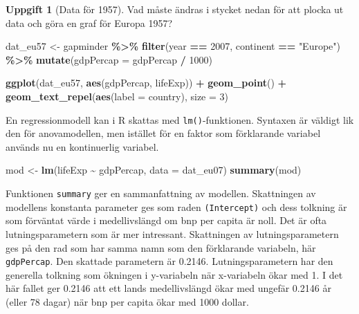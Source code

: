 \documentclass[
]{book}
\newenvironment{Shaded}{\begin{snugshade}}{\end{snugshade}}
\newcommand{\AttributeTok}[1]{\textcolor[rgb]{0.13,0.29,0.53}{#1}}
\newcommand{\DecValTok}[1]{\textcolor[rgb]{0.00,0.00,0.81}{#1}}
\newcommand{\FunctionTok}[1]{\textcolor[rgb]{0.13,0.29,0.53}{\textbf{#1}}}
\newcommand{\NormalTok}[1]{#1}
\newcommand{\OtherTok}[1]{\textcolor[rgb]{0.56,0.35,0.01}{#1}}
\newcommand{\SpecialCharTok}[1]{\textcolor[rgb]{0.81,0.36,0.00}{\textbf{#1}}}
\newcommand{\StringTok}[1]{\textcolor[rgb]{0.31,0.60,0.02}{#1}}
\theoremstyle{definition}
\theoremstyle{definition}
\theoremstyle{definition}
\newtheorem{exercise}{Uppgift}[chapter]
\theoremstyle{definition}
\theoremstyle{remark}
\begin{document}
\begin{exercise}[Data för 1957]

Vad måste ändras i stycket nedan för att plocka ut data och göra en graf för Europa 1957?

\begin{Shaded}
\begin{Highlighting}[]
\NormalTok{dat\_eu57 }\OtherTok{\textless{}{-}}\NormalTok{ gapminder }\SpecialCharTok{\%\textgreater{}\%} 
  \FunctionTok{filter}\NormalTok{(year }\SpecialCharTok{==} \DecValTok{2007}\NormalTok{, continent }\SpecialCharTok{==} \StringTok{"Europe"}\NormalTok{) }\SpecialCharTok{\%\textgreater{}\%} 
  \FunctionTok{mutate}\NormalTok{(}\AttributeTok{gdpPercap =}\NormalTok{ gdpPercap }\SpecialCharTok{/} \DecValTok{1000}\NormalTok{)}

\FunctionTok{ggplot}\NormalTok{(dat\_eu57, }\FunctionTok{aes}\NormalTok{(gdpPercap, lifeExp)) }\SpecialCharTok{+}
  \FunctionTok{geom\_point}\NormalTok{() }\SpecialCharTok{+}
  \FunctionTok{geom\_text\_repel}\NormalTok{(}\FunctionTok{aes}\NormalTok{(}\AttributeTok{label =}\NormalTok{ country), }\AttributeTok{size =} \DecValTok{3}\NormalTok{)}
\end{Highlighting}
\end{Shaded}

\end{exercise}

En regressionmodell kan i R skattas med \texttt{lm()}-funktionen. Syntaxen är väldigt lik den för anovamodellen, men istället för en faktor som förklarande variabel används nu en kontinuerlig variabel.

\begin{Shaded}
\begin{Highlighting}[]
\NormalTok{mod }\OtherTok{\textless{}{-}} \FunctionTok{lm}\NormalTok{(lifeExp }\SpecialCharTok{\textasciitilde{}}\NormalTok{ gdpPercap, }\AttributeTok{data =}\NormalTok{ dat\_eu07)}
\FunctionTok{summary}\NormalTok{(mod)}
\end{Highlighting}
\end{Shaded}

Funktionen \texttt{summary} ger en sammanfattning av modellen. Skattningen av modellens konstanta parameter ges som raden \texttt{(Intercept)} och dess tolkning är som förväntat värde i medellivslängd om bnp per capita är noll. Det är ofta lutningsparametern som är mer intressant. Skattningen av lutningsparametern ges på den rad som har samma namn som den förklarande variabeln, här \texttt{gdpPercap}. Den skattade parametern är 0.2146. Lutningsparametern har den generella tolkning som ökningen i y-variabeln när x-variabeln ökar med 1. I det här fallet ger 0.2146 att ett lands medellivslängd ökar med ungefär 0.2146 år (eller 78 dagar) när bnp per capita ökar med 1000 dollar.
\end{document}
